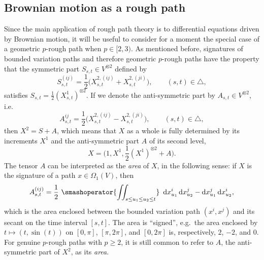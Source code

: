 \documentclass[11pt, letterpaper]{article}
\theoremstyle{definition}
\theoremstyle{remark}
\newcommand{\diff}{\mathop{}\!\mathrm{d}}
\begin{document}
\begin{appendices}
\subsection{Brownian motion as a rough path}
Since the main application of rough path theory is to differential equations driven by Brownian motion, it will be useful to consider for a moment the special case of a geometric $p$-rough path when $p \in [2,3)$. As mentioned before, signatures of bounded variation paths and therefore geometric $p$-rough paths have the property that the symmetric part $S_{s,t} \in V^{\otimes  2}$ defined by \[
    S^{(ij)}_{s,t} = \frac{1}{2} \Big( X^{2,(ij)}_{s,t} + X^{2,(ji)}_{s,t} \Big),\qquad (s,t) \in \triangle,
\] satisfies $S_{s,t} = \frac{1}{2} (X^1_{s,t})^{\otimes  2}$. If we denote the anti-symmetric part by $A_{s,t} \in V^{\otimes  2}$, i.e. \[
    A^{ij}_{s,t} = \frac{1}{2} \Big( X^{2,(ij)}_{s,t} - X^{2,(ji)}_{s,t} \Big),\qquad (s,t) \in \triangle,
\] then $X^2 = S + A$, which means that $X$ as a whole is fully determined by its increments $X^1$ and the anti-symmetric part $A$ of its second level, \[
X = \bigg(1, X^1, \frac{1}{2} (X^1)^{\otimes 2} + A\bigg).
\] The tensor $A$ can be interpreted as the \emph{area} of $X$, in the following sense: if $X$ is the signature of a path $x \in \Omega_1(V)$, then \[
A^{(ij)}_{s,t} = \frac{1}{2} \,\,\smashoperator{\iint_{s \le u_1 \le u_2 \le t}}\,\, \diff x^i_{u_1} \diff x^j_{u_2} - \diff x^j_{u_1} \diff x^i_{u_2},
\] which is the area enclosed between the bounded variation path $(x^i,x^j)$ and its secant on the time interval $[s,t]$. The area is ``signed'', e.g.\ the area enclosed by $t \mapsto (t, \sin(t))$ on $[0,\pi]$, $[\pi, 2\pi]$, and $[0,2\pi]$ is, respectively, $2$, $-2$, and $0$. For genuine $p$-rough paths with $p \ge 2$, it is still common to refer to $A$, the anti-symmetric part of $X^2$, as its \emph{area}.


\end{appendices}
\end{document}

